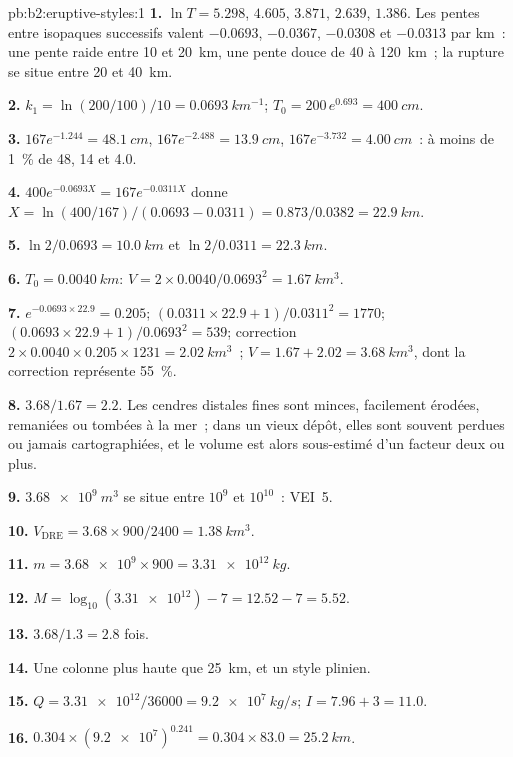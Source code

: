 \begin{solution}{pb:b2:eruptive-styles:1}
\textbf{1.} $\ln T = 5.298$, $4.605$, $3.871$, $2.639$, $1.386$. Les pentes entre
isopaques successifs valent $-0.0693$, $-0.0367$, $-0.0308$ et $-0.0313$ par km~: une
pente raide entre 10 et \qty{20}{km}, une pente douce de 40 à
\qty{120}{km}~; la rupture se situe entre 20 et \qty{40}{km}.

\textbf{2.} $k_1 = \ln(200/100)/10 = \qty{0.0693}{km^{-1}}$; $T_0 = 200\,e^{0.693} =
\qty{400}{cm}$.

\textbf{3.} $167e^{-1.244} = \qty{48.1}{cm}$, $167e^{-2.488} = \qty{13.9}{cm}$,
$167e^{-3.732} = \qty{4.00}{cm}$~: à moins de \qty{1}{\percent} de 48, 14 et 4.0.

\textbf{4.} $400e^{-0.0693X} = 167e^{-0.0311X}$ donne $X = \ln(400/167)/(0.0693 -
0.0311) = 0.873/0.0382 = \qty{22.9}{km}$.

\textbf{5.} $\ln2/0.0693 = \qty{10.0}{km}$ et $\ln2/0.0311 = \qty{22.3}{km}$.

\textbf{6.} $T_0 = \qty{0.0040}{km}$: $V = 2\times0.0040/0.0693^2 =
\qty{1.67}{km^3}$.

\textbf{7.} $e^{-0.0693\times22.9} = 0.205$; $(0.0311\times22.9 + 1)/0.0311^2 = 1770$;
$(0.0693\times22.9 + 1)/0.0693^2 = 539$; correction $2\times0.0040\times0.205\times1231 =
\qty{2.02}{km^3}$~; $V = 1.67 + 2.02 = \qty{3.68}{km^3}$, dont la correction représente
\qty{55}{\percent}.

\textbf{8.} $3.68/1.67 = 2.2$. Les cendres distales fines sont minces, facilement érodées,
remaniées ou tombées à la mer~; dans un vieux dépôt, elles sont souvent perdues ou jamais
cartographiées, et le volume est alors sous-estimé d'un facteur deux ou plus.

\textbf{9.} $\qty{3.68e9}{m^3}$ se situe entre $10^9$ et $10^{10}$~: VEI~5.

\textbf{10.} $V_{\mathrm{DRE}} = 3.68\times900/2400 = \qty{1.38}{km^3}$.

\textbf{11.} $m = \num{3.68e9}\times900 = \qty{3.31e12}{kg}$.

\textbf{12.} $M = \log_{10}(\num{3.31e12}) - 7 = 12.52 - 7 = 5.52$.

\textbf{13.} $3.68/1.3 = 2.8$ fois.

\textbf{14.} Une colonne plus haute que \qty{25}{km}, et un style plinien.

\textbf{15.} $Q = \num{3.31e12}/36000 = \qty{9.2e7}{kg/s}$; $I = 7.96 + 3 = 11.0$.

\textbf{16.} $0.304\times(\num{9.2e7})^{0.241} = 0.304\times83.0 = \qty{25.2}{km}$.


\end{solution}
